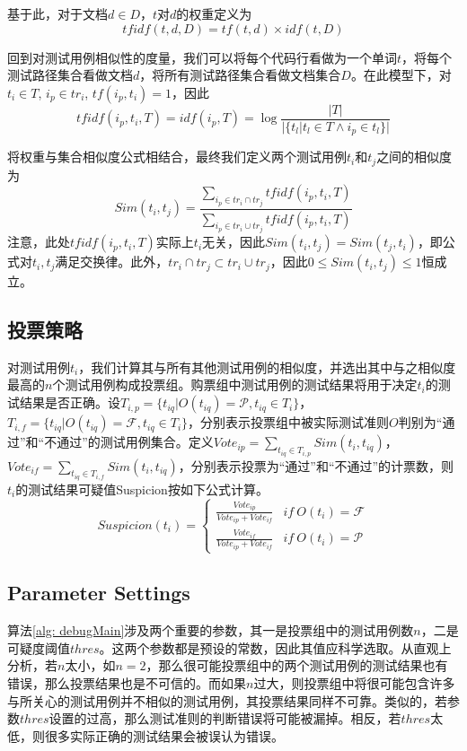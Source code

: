 基于此，对于文档$d \in D$，$t$对$d$的权重定义为
$$tfidf(t, d, D) = tf(t, d) \times idf(t, D)
$$

回到对测试用例相似性的度量，我们可以将每个代码行看做为一个单词$t$，将每个测试路径集合看做文档$d$，将所有测试路径集合看做文档集合$D$。在此模型下，对$t_i \in T$, $i_p \in tr_i$, $tf(i_p, t_i) = 1$，因此
$$
tfidf(i_p, t_i, T) = idf(i_p, T) = \log{\frac{|T|}{|\{t_l|t_l \in T \wedge i_p \in t_l\}|}}
$$

将权重与集合相似度公式相结合，最终我们定义两个测试用例$t_i$和$t_j$之间的相似度为
$$
Sim (t_i, t_j) = \frac{\sum_{i_p \in {tr}_i \cap {tr}_j}^{} tfidf(i_p, t_i, T)}{\sum_{i_p \in {tr}_i \cup {tr}_j}^{} tfidf(i_p, t_i, T)}
$$
注意，此处$tfidf(i_p, t_i, T)$实际上$t_i$无关，因此$Sim(t_i, t_j) = Sim(t_j, t_i)$，即公式对$t_i,t_j$满足交换律。此外，${tr}_i \cap {tr}_j \subset {tr}_i \cup {tr}_j$，因此$0 \le Sim(t_i, t_j) \le 1$恒成立。

\subsection{投票策略}
对测试用例$t_i$，我们计算其与所有其他测试用例的相似度，并选出其中与之相似度最高的$n$个测试用例构成投票组。购票组中测试用例的测试结果将用于决定$t_i$的测试结果是否正确。设$T_{i, p} = \{t_{iq} | O(t_{iq}) = \mathcal{P}, t_{iq}\in T_i\}$， $T_{i, f} = \{t_{iq} | O(t_{iq}) = \mathcal{F}, t_{iq}\in T_i\}$，分别表示投票组中被实际测试准则$O$判别为“通过”和“不通过”的测试用例集合。定义$Vote_{ip} = \sum_{t_{iq} \in T_{i, p}} Sim(t_i, t_{iq})$，$Vote_{if} = \sum_{t_{iq} \in T_{i, f}} Sim(t_i, t_{iq})$，分别表示投票为“通过”和“不通过”的计票数，则$t_i$的测试结果可疑值Suspicion按如下公式计算。
$$
Suspicion(t_i) = \left\{
\begin{array}{lr}
\frac {Vote_{ip}}{Vote_{ip} + Vote_{if}}     & if \ O(t_i) = \mathcal{F} \\
\frac {Vote_{if}}{Vote_{ip} + Vote_{if}}     & if \ O(t_i) = \mathcal{P}
\end{array}
\right.
$$

\subsection{Parameter Settings}
\label{subsection: param}

算法\ref{alg: debugMain}涉及两个重要的参数，其一是投票组中的测试用例数$n$，二是可疑度阈值$thres$。这两个参数都是预设的常数，因此其值应科学选取。从直观上分析，若$n$太小，如$n = 2$，那么很可能投票组中的两个测试用例的测试结果也有错误，那么投票结果也是不可信的。而如果$n$过大，则投票组中将很可能包含许多与所关心的测试用例并不相似的测试用例，其投票结果同样不可靠。类似的，若参数$thres$设置的过高，那么测试准则的判断错误将可能被漏掉。相反，若$thres$太低，则很多实际正确的测试结果会被误认为错误。

